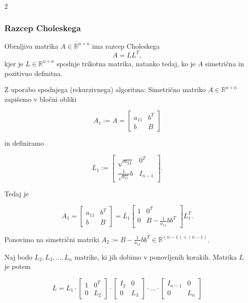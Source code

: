 \documentclass{article}
\begin{document}
\begin{multicols}{2}
	\subsubsection{Razcep Choleskega}
	Obrnljiva matrika \( A \in \mathbb{R}^{n \times n} \) ima razcep Choleskega
	\[ A = LL^T, \]
	kjer je \( L \in \mathbb{R}^{n \times n} \) spodnje trikotna matrika, natanko tedaj, ko je \( A \) simetrična in pozitivno definitna.

	Z uporabo spodnjega (rekurzivnega) algoritma:
	Simetrično matriko \( A \in \mathbb{R}^{n \times n} \) zapišemo v bločni obliki

	\[
		A_1 := A = \begin{bmatrix}
			a_{11} & b^T \\
			b      & B
		\end{bmatrix}
	\]

	in definiramo

	\[
		L_1 := \begin{bmatrix}
			\sqrt{a_{11}}             & 0^T     \\
			\frac{1}{\sqrt{a_{11}}} b & I_{n-1}
		\end{bmatrix}.
	\]

	Tedaj je

	\[
		A_1 = \begin{bmatrix}
			a_{11} & b^T \\
			b      & B
		\end{bmatrix} = L_1 \begin{bmatrix}
			1 & 0^T                       \\
			0 & B - \frac{1}{a_{11}} bb^T
		\end{bmatrix} L_1^T.
	\]

	Ponovimo na simetrični matriki \( A_2 := B - \frac{1}{a_{11}} bb^T \in \mathbb{R}^{(n-1) \times (n-1)} \).

	Naj bodo \( L_2, L_3, \ldots, L_n \) matrike, ki jih dobimo v ponovljenih korakih. Matrika \( L \) je potem

	\[
		L = L_1 \cdot \left[ \begin{array}{cc}
				1 & 0^T \\
				0 & L_2
			\end{array} \right] \cdot \left[ \begin{array}{cc}
				I_2 & 0   \\
				0   & L_3
			\end{array} \right] \cdot \ldots \cdot \left[ \begin{array}{cc}
				I_{n-1} & 0   \\
				0       & L_n
			\end{array} \right]
	\]


\end{multicols}
\end{document}
